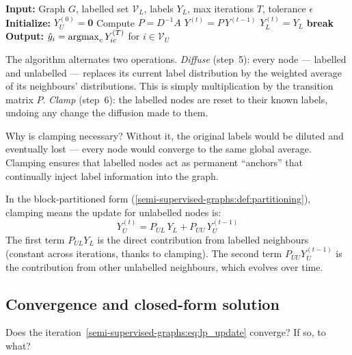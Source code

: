 \begin{notechapter}
\begin{algorithm}[H]
\caption{Label propagation (Zhu and Ghahramani, 2002)}
\label{semi-supervised-graphs:alg:label_prop}
\begin{algorithmic}[1]
\State \textbf{Input:} Graph $G$, labelled set $\mathcal{V}_L$, labels $Y_L$,
        max iterations $T$, tolerance $\epsilon$
\State \textbf{Initialize:} $Y_U^{(0)} = \mathbf{0}$
\State Compute $P = D^{-1}A$
    \State $Y^{(t)} = P \, Y^{(t-1)}$
    \State $Y_L^{(t)} = Y_L$ 
     \textbf{break} \EndIf
\EndFor
\State \textbf{Output:} $\hat{y}_i = \operatorname*{argmax}_c Y_{ic}^{(T)}$ for
      $i \in \mathcal{V}_U$
\end{algorithmic}
\end{algorithm}

The algorithm alternates two operations. \emph{Diffuse} (step~5): every
node --- labelled and unlabelled --- replaces its current label distribution by the
weighted average of its neighbours' distributions. This is simply
multiplication by the transition matrix $P$. \emph{Clamp} (step~6): the
labelled nodes are reset to their known labels, undoing any change the
diffusion made to them.

Why is clamping necessary? Without it, the original labels would be diluted
and eventually lost --- every node would converge to the same global average.
Clamping ensures that labelled nodes act as permanent ``anchors'' that
continually inject label information into the graph.

In the block-partitioned form (\cref{semi-supervised-graphs:def:partitioning}), clamping
means the update for unlabelled nodes is:
\begin{equation}
\label{semi-supervised-graphs:eq:lp_update}
Y_U^{(t)} = P_{UL}\,Y_L + P_{UU}\,Y_U^{(t-1)}
\end{equation}
The first term $P_{UL}Y_L$ is the direct contribution from labelled neighbours
(constant across iterations, thanks to clamping). The second term
$P_{UU}Y_U^{(t-1)}$ is the contribution from other unlabelled neighbours,
which evolves over time.

\subsection{Convergence and closed-form solution}

Does the iteration~\eqref{semi-supervised-graphs:eq:lp_update} converge? If so, to what?


\end{notechapter}
